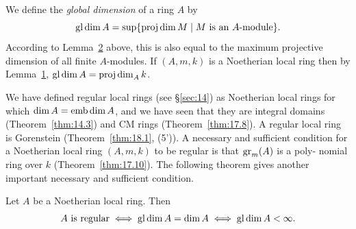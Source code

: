 We define the \emph{global dimension} of a ring $A$ by
\[
  \operatorname{gl\,dim} A = \sup \{\operatorname{proj\,dim} M \mid M \text{ is an $A$-module}\}.
\]
According to Lemma~\hyperref[lem:19.2]{2} above, this is also equal to the maximum projective
dimension of all finite $A$-modules. If $(A, m, k)$ is a Noetherian local ring then by
Lemma~\hyperref[lem:19.1]{1}, $\operatorname{gl\,dim} A = \operatorname{proj\,dim}_A k$.

We have defined regular local rings (see \S\ref{sec:14}) as Noetherian local rings
for which $\dim A = \operatorname{emb\,dim} A$, and we have seen that they are integral
domains (Theorem~\ref{thm:14.3}) and CM rings (Theorem~\ref{thm:17.8}). A regular local
ring is Gorenstein (Theorem~\ref{thm:18.1}, (5')). A necessary and sufficient condition
for a Noetherian local ring $(A, m, k)$ to be regular is that $\operatorname{gr}_m(A)$ is a poly-
nomial ring over $k$ (Theorem~\ref{thm:17.10}). The following theorem gives another
important necessary and sufficient condition.

\begin{theorem}[Serre]\label{thm:19.2}
Let $A$ be a Noetherian local ring. Then
\[
  A \text{ is regular} \iff \operatorname{gl\,dim} A = \dim A \iff \operatorname{gl\,dim} A < \infty.
\]
\end{theorem}

